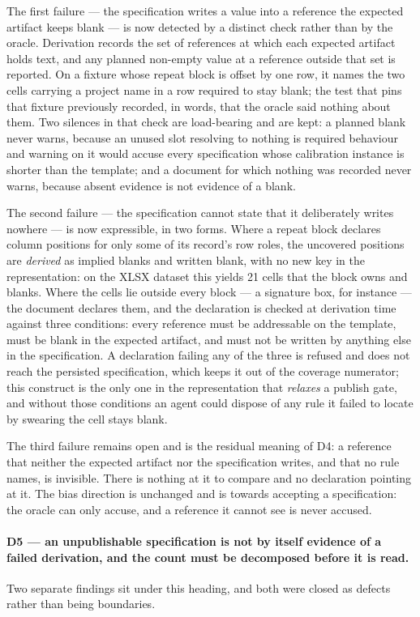 The first failure --- the specification writes a value into a reference the expected artifact
keeps blank --- is now detected by a distinct check rather than by the oracle. Derivation
records the set of references at which each expected artifact holds text, and any planned
non-empty value at a reference outside that set is reported. On a fixture whose repeat block
is offset by one row, it names the two cells carrying a project name in a row required to stay
blank; the test that pins that fixture previously recorded, in words, that the oracle said
nothing about them. Two silences in that check are load-bearing and are kept: a planned blank
never warns, because an unused slot resolving to nothing is required behaviour and warning on
it would accuse every specification whose calibration instance is shorter than the template;
and a document for which nothing was recorded never warns, because absent evidence is not
evidence of a blank.

The second failure --- the specification cannot state that it deliberately writes nowhere ---
is now expressible, in two forms. Where a repeat block declares column positions for only some
of its record's row roles, the uncovered positions are \emph{derived} as implied blanks and
written blank, with no new key in the representation: on the XLSX dataset this yields 21 cells
that the block owns and blanks. Where the cells lie outside every block --- a signature box,
for instance --- the document declares them, and the declaration is checked at derivation time
against three conditions: every reference must be addressable on the template, must be blank in
the expected artifact, and must not be written by anything else in the specification. A
declaration failing any of the three is refused and does not reach the persisted
specification, which keeps it out of the coverage numerator; this construct is the only one in
the representation that \emph{relaxes} a publish gate, and without those conditions an agent
could dispose of any rule it failed to locate by swearing the cell stays blank.

The third failure remains open and is the residual meaning of D4: a reference that neither the
expected artifact nor the specification writes, and that no rule names, is invisible. There is
nothing at it to compare and no declaration pointing at it. The bias direction is unchanged
and is towards accepting a specification: the oracle can only accuse, and a reference it
cannot see is never accused.

\paragraph{D5 --- an unpublishable specification is not by itself evidence of a failed
derivation, and the count must be decomposed before it is read.}
Two separate findings sit under this heading, and both were closed as defects rather than
being boundaries.

